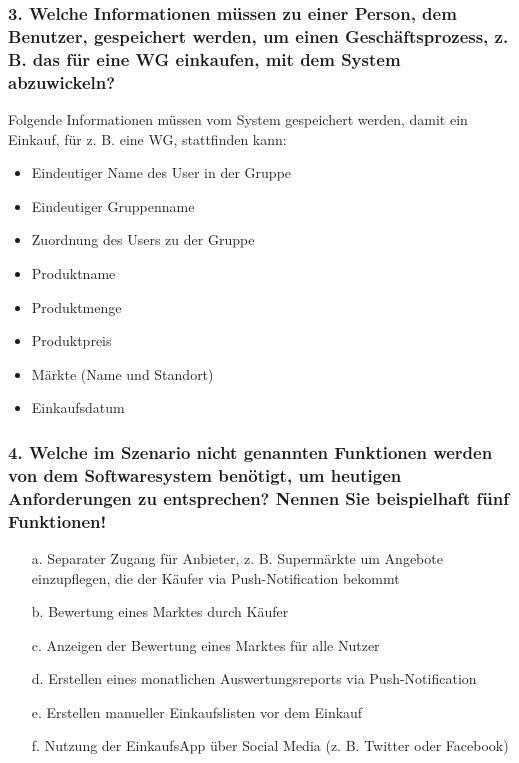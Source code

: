 \documentclass[12pt,a4paper]{article}
\begin{document}
\subsubsection*{3. Welche Informationen müssen zu einer Person, dem Benutzer, gespeichert werden, um einen Geschäftsprozess, z. B. das für eine WG einkaufen, mit dem System abzuwickeln?}
Folgende Informationen müssen vom System gespeichert werden, damit ein Einkauf, für z. B. eine WG, stattfinden kann:
\begin{itemize} 
\item Eindeutiger Name des User in der Gruppe %
\item Eindeutiger Gruppenname %
\item Zuordnung des Users zu der Gruppe %
\item Produktname
\item Produktmenge
\item Produktpreis
\item Märkte (Name und Standort)
\item Einkaufsdatum
\end{itemize}
\subsubsection*{4. Welche im Szenario nicht genannten Funktionen werden von dem Softwaresystem benötigt, um heutigen Anforderungen zu entsprechen? Nennen Sie beispielhaft fünf Funktionen!}
\begin{itemize}
\item[a.] Separater Zugang für Anbieter, z. B. Supermärkte um Angebote einzupflegen, die der Käufer via Push-Notification bekommt
\item[b.] Bewertung eines Marktes durch Käufer
\item[c.] Anzeigen der Bewertung eines Marktes für alle Nutzer
\item[d.] Erstellen eines monatlichen Auswertungsreports via Push-Notification 
\item[e.] Erstellen manueller Einkaufslisten vor dem Einkauf 
\item[f.] Nutzung der EinkaufsApp über Social Media (z. B. Twitter oder Facebook)
\end{itemize} 
\newpage
\end{document}
